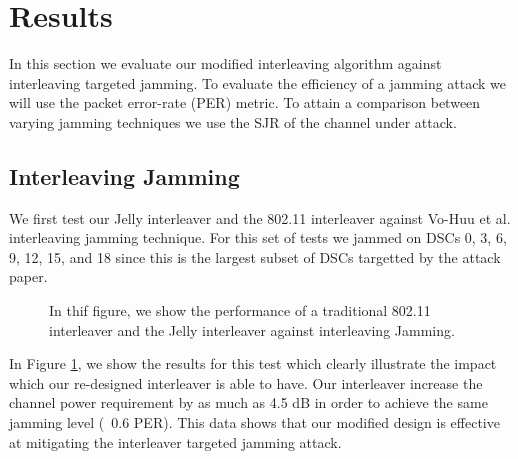 \documentclass[sigconf]{acmart}
\begin{document}
\section{Results}
\label{sec:results}

In this section we evaluate our modified interleaving algorithm against interleaving targeted jamming. To evaluate the efficiency of a jamming attack we will use the packet error-rate (PER) metric. To attain a comparison between varying jamming techniques we use the SJR of the channel under attack.  

\subsection{Interleaving Jamming}

We first test our Jelly interleaver and the 802.11 interleaver against Vo-Huu et al. interleaving jamming technique. For this set of tests we jammed on DSCs 0, 3, 6, 9, 12, 15, and 18 since this is the largest subset of DSCs targetted by the attack paper. 

\begin{figure}[ht]
    \centering
    
    
    \caption{In thif figure, we show the performance of a traditional 802.11 interleaver and the Jelly interleaver against interleaving Jamming.}
    \label{fig:interleaving_jamming}
\end{figure}

In Figure \ref{fig:interleaving_jamming}, we show the results for this test which clearly illustrate the impact which our re-designed interleaver is able to have. Our interleaver increase the channel power requirement by as much as 4.5 dB in order to achieve the same jamming level (~0.6 PER). This data shows that our modified design is effective at mitigating the interleaver targeted jamming attack. 
\end{document}
